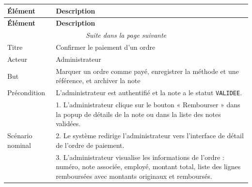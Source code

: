 \documentclass[12pt,a4paper]{report}
\begin{document}
\begin{longtable}{|p{3.5cm}|p{11cm}|}

\hline

\textbf{Élément} & \textbf{Description} \\

\hline

\endfirsthead



\hline

\textbf{Élément} & \textbf{Description} \\

\hline

\endhead



\hline

\multicolumn{2}{|c|}{\textit{Suite dans la page suivante}} \\

\hline

\endfoot



\hline

\endlastfoot



Titre & Confirmer le paiement d'un ordre \\

\hline

Acteur & Administrateur \\

\hline

But & Marquer un ordre comme payé, enregistrer la méthode et une référence, et archiver la note \\

\hline

Précondition & L'administrateur est authentifié et la note a le statut \texttt{VALIDEE}. \\

\hline

\multirow{10}{*}{Scénario nominal} & 1. L'administrateur clique sur le bouton « Rembourser » dans la popup de détails de la note ou dans la liste des notes validées. \\

& 2. Le système redirige l'administrateur vers l'interface de détail de l'ordre de paiement. \\

& 3. L'administrateur visualise les informations de l'ordre : numéro, note associée, employé, montant total, liste des lignes remboursées avec montants originaux et remboursés. \\


\end{longtable}
\end{document}
